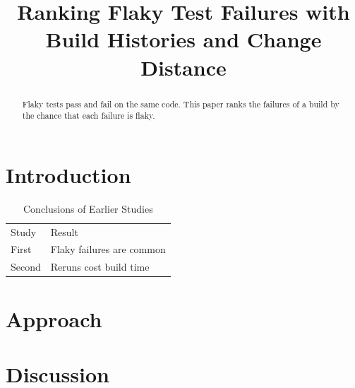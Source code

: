 \documentclass[10pt,conference,letterpaper]{IEEEtran}
\begin{document}
\title{Ranking Flaky Test Failures with\\Build Histories and Change Distance}
\author{}
\maketitle

\begin{abstract}
Flaky tests pass and fail on the same code. This paper ranks the failures of a build by the
chance that each failure is flaky.
\end{abstract}

\section{Introduction}
\lipsum[1-4]

\begin{table}[t]
\caption{Conclusions of Earlier Studies}
\centering
\begin{tabular}{ll}
Study & Result \\
First & Flaky failures are common \\
Second & Reruns cost build time \\
\end{tabular}
\end{table}

\section{Approach}
\lipsum[5-9]

\section{Discussion}
\lipsum[10-12]
\end{document}
